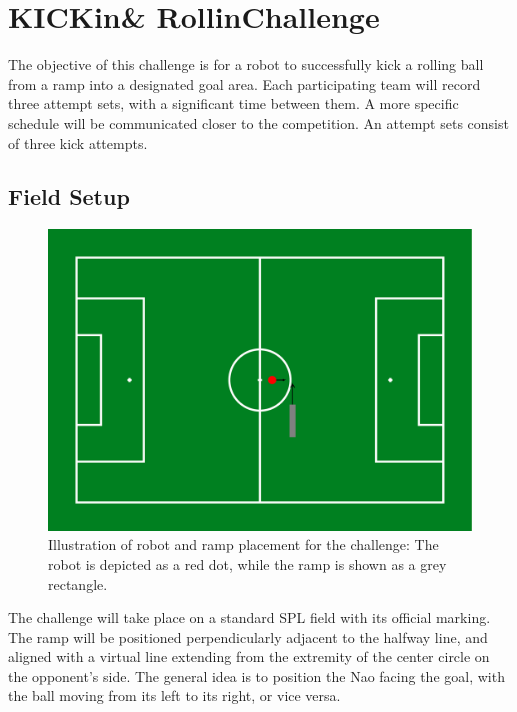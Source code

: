\section{KICKin\textquotesingle \& Rollin\textquotesingle Challenge}

The objective of this challenge is for a robot to successfully kick a rolling ball from a ramp into a designated goal area. 
Each participating team will record three attempt sets, with a significant time between them.
A more specific schedule will be communicated closer to the competition.
An attempt sets consist of three kick attempts. 

\subsection{Field Setup}

\begin{figure}[t]
    \centerline{\includegraphics[width=\columnwidth]{figs/KICKin-Rollin-Challenge.pdf}}
    \caption{Illustration of robot and ramp placement for the challenge: The robot is depicted as a red dot, while the ramp is shown as a grey rectangle.}
    \label{fig:KICKin-Rolling-Challenge}
\end{figure}

The challenge will take place on a standard SPL field with its official marking. 
The ramp will be positioned perpendicularly adjacent to the halfway line, and aligned with a virtual line extending from the extremity of the center circle on the opponent's side.
The general idea is to position the Nao facing the goal, with the ball moving from its left to its right, or vice versa.

